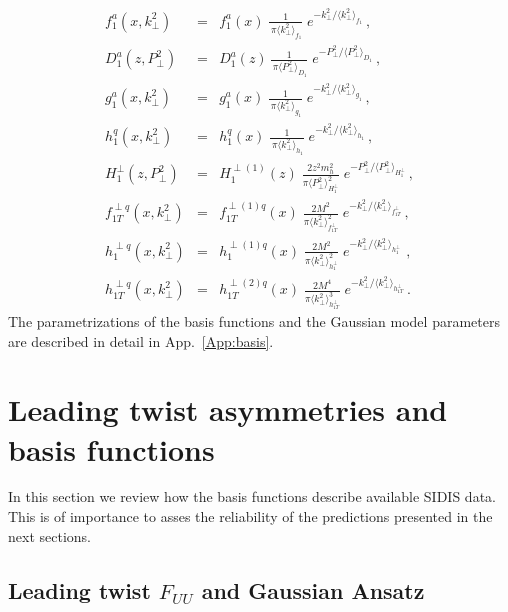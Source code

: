 \documentclass[a4paper,11pt]{article}
\newcommand{\ba}{\begin{eqnarray}}
\newcommand{\ea}{\end{eqnarray}}
\newcommand{\la}{\langle}
\newcommand{\ra}{\rangle}
\def\kperp{k_\perp}
\def\pperp{P_\perp}
\def\avkperp{\la \kperp^2 \ra}
\def\avpperp{\la \pperp^2 \ra}
\begin{document}
\begin{subequations}\ba
	f^a_1(x,\kperp^2) &=& f^a_1(x)\;
    	\frac{1}{\,\pi\avkperp_{f_1}}\;e^{-\kperp^2/\avkperp_{f_1}} \, ,
	\label{Eq:Gauss-f1}\\
    	D^a_1(z,\pperp^2) &=& D_1^a(z)\,
    	\frac{1}{\,\pi\avpperp_{D_1}}\;e^{-\pperp^2/\avpperp_{D_1}} \, ,
	\label{Eq:Gauss-D1}\\
	g^a_1(x,\kperp^2) &=& g^a_1(x)\;
    	\frac{1}{\,\pi\avkperp_{g_1}}\;e^{-\kperp^2/\avkperp_{g_1}} \, ,
	\label{Eq:Gauss-g1}\\
	h_{1}^{q} (x, \kperp^2) &=& h_{1}^{q} (x)\;
  	\frac{1}{\,\pi \avkperp_{h_1}}\;e^{-{\kperp^2}/{\avkperp_{h_1} }} \, ,
	\label{Eq:Gauss-h1}\\
	H_{1}^{\perp}(z,\pperp^2) &=&  H_{1}^{\perp (1)}(z) \;  
	\frac{2 z^2 m_h^2}{\pi \avpperp_{H_{1}^\perp}^2} \;
	e^{-\pperp^2/{\avpperp_{H_{1}^\perp}}}\, ,\\
	f_{1T}^{\perp q}(x,\kperp^2) &=&  f_{1T}^{\perp (1) q}(x)   \;
	\frac{2 M^2}{\pi \avkperp_{f_{1T}^\perp}^2} \;
	e^{-\kperp^2/{\avkperp_{f_{1T}^\perp}}} 
	\label{Eq:Gauss-f1Tperp}\, ,\\
	h_{1}^{\perp q}(x,\kperp^2) &=&  h_{1}^{\perp (1) q}(x)\;
   	\frac{2 M^2}{\pi \avkperp_{h_{1}^\perp}^2}\;
 	e^{-\kperp^2/{\avkperp_{h_{1}^\perp}}}\,
	\label{Eq:Gauss-h1perp}\, ,\\
	h_{1T}^{\perp q}(x,\kperp^2) &=&  h_{1T}^{\perp (2) q}(x)\;
   	\frac{2 M^4}{\pi \avkperp_{h_{1T}^\perp}^3} \;
	e^{-\kperp^2/{\avkperp_{h_{1T}^\perp}}}
	\label{Eq:Gauss-h1Tperp}\, .
\ea\end{subequations}
The parametrizations of the basis functions and the Gaussian model
parameters are described in detail in App.~\ref{App:basis}.





\section{Leading twist asymmetries and basis functions}
\label{Sec-5:twist-2+basis}
In this section we review how the basis functions describe available
SIDIS data. This is of importance to asses the reliability of the
predictions presented in the next sections.

\subsection{\boldmath Leading twist $F_{UU}$ and Gaussian Ansatz}
\label{Sec-5.1:FUU-basis}
\end{document}

